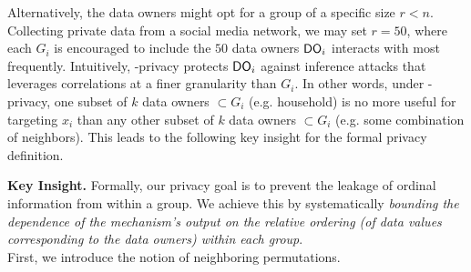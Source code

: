\item  Alternatively, the data owners might opt for a group of a specific size $r < n$. Collecting private data from a social media network, we may set $r = 50$, where each $G_i$ is encouraged to include the $50$ data owners $\textsf{DO}_i$ interacts with most frequently. 
\squishendfour 
   \vspace{-0.3cm}
Intuitively, \name-privacy protects $\textsf{DO}_i$ against inference attacks that leverages correlations at a finer granularity than $G_i$. In other words, under \name-privacy, one subset of $k$ data owners $\subset G_i$ (e.g. household) is no more useful for targeting $x_i$ than any other subset of $k$ data owners $\subset G_i$ (e.g. some combination of neighbors). 
This leads to the following key insight for the formal privacy definition. 

\textbf{Key Insight.} Formally, our privacy goal is to prevent the leakage of ordinal information from within a group. We achieve this by  systematically \textit{bounding the dependence of the mechanism's output on the relative ordering (of data values corresponding to the data owners) within each group}. \\First, we introduce the notion of neighboring permutations. 

